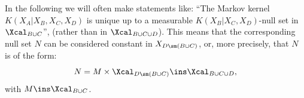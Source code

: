 
\begin{Rem}
    In the following we will often make statements like:
    ``The Markov kernel $K(X_A|X_B,X_C,X_D)$ is unique up to a measurable $K(X_B|X_C,X_D)$-null set in $\Xcal_{B\cup C}$'',  (rather than in $\Xcal_{B \cup C \cup D}$). 
This means that the corresponding null set $N$ can be considered constant in $X_{D \sm (B \cup C)}$, or, more precisely, 
that $N$ is of the form:
\[ N = M \times \Xcal_{D \sm (B \cup C)}  \ins \Xcal_{B \cup C \cup D},  \]
with $M \ins \Xcal_{B\cup C}$.
\end{Rem}


